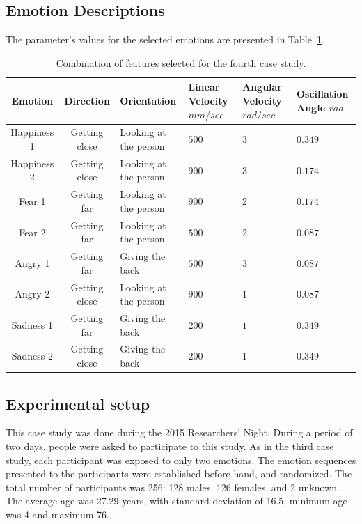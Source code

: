 \subsection{Emotion Descriptions} 

The parameter's values for the selected emotions are presented in Table~\ref{table:features_2}.
\begin{table}[tbh]
\begin{center}
\caption{Combination of features selected for the fourth case study.}
\label{table:features_2}
\small
\begin{tabular}{|c|c|p{2.5 cm}|p{2 cm}|p{2 cm}|p{2.5cm}|}
\hline 
\textbf{Emotion} & \textbf{Direction} & \textbf{Orientation} & \textbf{Linear Velocity} $mm/sec$& \textbf{Angular Velocity} $rad/sec$& \textbf{Oscillation Angle} $rad$\\
\hline
Happiness 1 & Getting close & Looking at the person & $500$  & $3$ & $0.349$ \\
\hline
Happiness 2 & Getting close & Looking at the person & $900$ & $3$ & $0.174$ \\
\hline
Fear 1 & Getting far & Looking at the person & $900$ & $2$ & $0.174$ \\
\hline
Fear 2 & Getting far & Looking at the person & $500$ & $2$ & $0.087$ \\
\hline
Angry 1 & Getting far & Giving the back & $500$ & $3$ & $0.087$ \\
\hline
Angry 2 & Getting close & Looking at the person & $900$ & $1$ & $0.087$ \\
\hline
Sadness 1 & Getting far & Giving the back & $200$ & $1$ & $0.349$ \\
\hline
Sadness 2 & Getting close & Giving the back & $200$ & $1$  & $0.349$ \\
\hline
\end{tabular}
\end{center}
\end{table} 

\subsection{Experimental setup}

This case study was done during the 2015 Researchers' Night. During a period of two days, people were asked to participate to this study. As in the third case study, each participant was exposed to only two emotions. The emotion sequences presented to the participants were established before hand, and randomized. The total number of participants was 256: 128 males, 126 females, and 2 unknown. The average age was 27.29 years, with standard deviation of 16.5, minimum age was 4 and maximum 76. 

